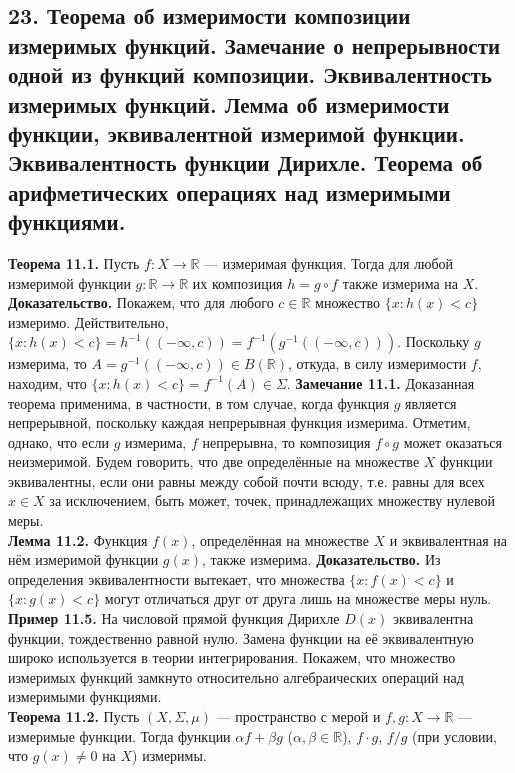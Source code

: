 \documentclass[12pt]{article}
\begin{document}
\subsection*{23. Теорема об измеримости композиции измеримых функций. Замечание о
непрерывности одной из функций композиции. Эквивалентность измеримых функций.
Лемма об измеримости функции, эквивалентной измеримой функции.
Эквивалентность функции Дирихле. Теорема об арифметических операциях над
измеримыми функциями.}
\textbf{Теорема 11.1.} Пусть $f:X\to\mathbb{R}$ — измеримая функция. Тогда для любой измеримой функции $g:\mathbb{R}\to\mathbb{R}$ их композиция $h=g\circ f$ также измерима на $X$. \\\textbf{Доказательство.} Покажем, что для любого $c\in\mathbb{R}$ множество $\{x:h(x)<c\}$ измеримо. Действительно, $\{x:h(x)<c\}=h^{-1}((-\infty,c))=f^{-1}(g^{-1}((-\infty,c)))$. Поскольку $g$ измерима, то $A=g^{-1}((-\infty,c))\in B(\mathbb{R})$, откуда, в силу измеримости $f$, находим, что $\{x:h(x)<c\}=f^{-1}(A)\in\Sigma$. \textbf{Замечание 11.1.} Доказанная теорема применима, в частности, в том случае, когда функция $g$ является непрерывной, поскольку каждая непрерывная функция измерима. Отметим, однако, что если $g$ измерима, $f$ непрерывна, то композиция $f\circ g$ может оказаться неизмеримой. Будем говорить, что две определённые на множестве $X$ функции эквивалентны, если они равны между собой почти всюду, т.е. равны для всех $x\in X$ за исключением, быть может, точек, принадлежащих множеству нулевой меры. \\\textbf{Лемма 11.2.} Функция $f(x)$, определённая на множестве $X$ и эквивалентная на нём измеримой функции $g(x)$, также измерима. \textbf{Доказательство.} Из определения эквивалентности вытекает, что множества $\{x:f(x)<c\}$ и $\{x:g(x)<c\}$ могут отличаться друг от друга лишь на множестве меры нуль. \\\textbf{Пример 11.5.} На числовой прямой функция Дирихле $D(x)$ эквивалентна функции, тождественно равной нулю. Замена функции на её эквивалентную широко используется в теории интегрирования. Покажем, что множество измеримых функций замкнуто относительно алгебраических операций над измеримыми функциями. \\\textbf{Теорема 11.2.} Пусть $(X,\Sigma,\mu)$ — пространство с мерой и $f,g:X\to\mathbb{R}$ — измеримые функции. Тогда функции $\alpha f+\beta g$ ($\alpha,\beta\in\mathbb{R}$), $f\cdot g$, $f/g$ (при условии, что $g(x)\neq 0$ на $X$) измеримы.

\end{document}
